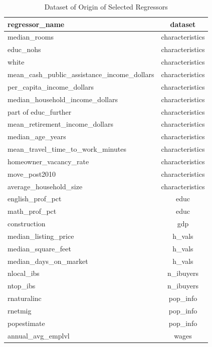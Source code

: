 \begin{table}
    \centering
    \caption{Dataset of Origin of Selected Regressors}\label{regressor_origin}
    \begin{tabular}{| l || c |}
    \hline
    regressor\_name &          dataset \\
    \hline
    \hline
    median\_rooms &  characteristics \\ \hline
    educ\_nohs &  characteristics \\ \hline
    white &  characteristics \\ \hline
    mean\_cash\_public\_assistance\_income\_dollars &  characteristics \\ \hline
    per\_capita\_income\_dollars &  characteristics \\ \hline
    median\_household\_income\_dollars &  characteristics \\ \hline
    part of educ\_further &  characteristics \\ \hline
    mean\_retirement\_income\_dollars &  characteristics \\ \hline
    median\_age\_years &  characteristics \\ \hline
    mean\_travel\_time\_to\_work\_minutes &  characteristics \\ \hline
    homeowner\_vacancy\_rate &  characteristics \\ \hline
    move\_post2010 &  characteristics \\ \hline
    average\_household\_size &  characteristics \\ \hline
    english\_prof\_pct &             educ \\ \hline
    math\_prof\_pct &             educ \\ \hline
    construction &              gdp \\ \hline
    median\_listing\_price &           h\_vals \\ \hline
    median\_square\_feet &           h\_vals \\ \hline
    median\_days\_on\_market &           h\_vals \\ \hline
    nlocal\_ibs &        n\_ibuyers \\ \hline
    ntop\_ibs &        n\_ibuyers \\ \hline
    rnaturalinc &         pop\_info \\ \hline
    rnetmig &         pop\_info \\ \hline
    popestimate &         pop\_info \\ \hline
    annual\_avg\_emplvl &            wages \\ \hline
    \end{tabular}
\end{table}

